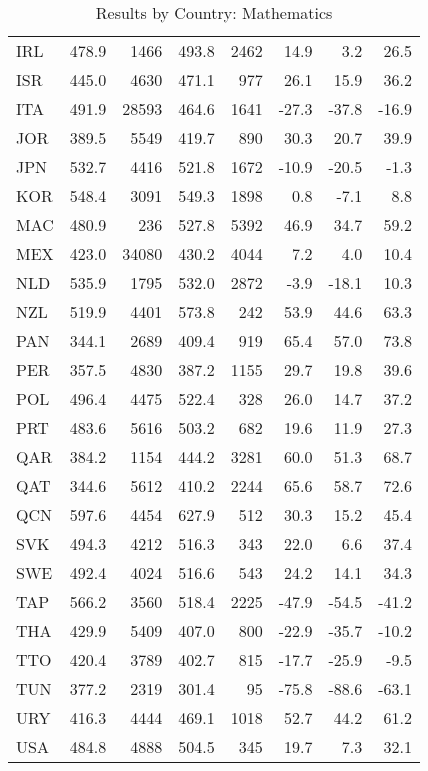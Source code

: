 \begin{table}[ht]
\begin{center}
{\begin{tabular}{lrr@{\extracolsep{10pt}}rr@{\extracolsep{10pt}}rrr}
  IRL & 478.9 & 1466 & 493.8 & 2462 & 14.9 & 3.2 & 26.5 \\ 
  ISR & 445.0 & 4630 & 471.1 & 977 & 26.1 & 15.9 & 36.2 \\ 
  ITA & 491.9 & 28593 & 464.6 & 1641 & -27.3 & -37.8 & -16.9 \\ 
  JOR & 389.5 & 5549 & 419.7 & 890 & 30.3 & 20.7 & 39.9 \\ 
  JPN & 532.7 & 4416 & 521.8 & 1672 & -10.9 & -20.5 & -1.3 \\ 
  KOR & 548.4 & 3091 & 549.3 & 1898 & 0.8 & -7.1 & 8.8 \\ 
  MAC & 480.9 & 236 & 527.8 & 5392 & 46.9 & 34.7 & 59.2 \\ 
  MEX & 423.0 & 34080 & 430.2 & 4044 & 7.2 & 4.0 & 10.4 \\ 
  NLD & 535.9 & 1795 & 532.0 & 2872 & -3.9 & -18.1 & 10.3 \\ 
  NZL & 519.9 & 4401 & 573.8 & 242 & 53.9 & 44.6 & 63.3 \\ 
  PAN & 344.1 & 2689 & 409.4 & 919 & 65.4 & 57.0 & 73.8 \\ 
  PER & 357.5 & 4830 & 387.2 & 1155 & 29.7 & 19.8 & 39.6 \\ 
  POL & 496.4 & 4475 & 522.4 & 328 & 26.0 & 14.7 & 37.2 \\ 
  PRT & 483.6 & 5616 & 503.2 & 682 & 19.6 & 11.9 & 27.3 \\ 
  QAR & 384.2 & 1154 & 444.2 & 3281 & 60.0 & 51.3 & 68.7 \\ 
  QAT & 344.6 & 5612 & 410.2 & 2244 & 65.6 & 58.7 & 72.6 \\ 
  QCN & 597.6 & 4454 & 627.9 & 512 & 30.3 & 15.2 & 45.4 \\ 
  SVK & 494.3 & 4212 & 516.3 & 343 & 22.0 & 6.6 & 37.4 \\ 
  SWE & 492.4 & 4024 & 516.6 & 543 & 24.2 & 14.1 & 34.3 \\ 
  TAP & 566.2 & 3560 & 518.4 & 2225 & -47.9 & -54.5 & -41.2 \\ 
  THA & 429.9 & 5409 & 407.0 & 800 & -22.9 & -35.7 & -10.2 \\ 
  TTO & 420.4 & 3789 & 402.7 & 815 & -17.7 & -25.9 & -9.5 \\ 
  TUN & 377.2 & 2319 & 301.4 & 95 & -75.8 & -88.6 & -63.1 \\ 
  URY & 416.3 & 4444 & 469.1 & 1018 & 52.7 & 44.2 & 61.2 \\ 
  USA & 484.8 & 4888 & 504.5 & 345 & 19.7 & 7.3 & 32.1 \\ 
   \hline
\end{tabular}
}
\caption{Results by Country: Mathematics}
\label{level2math}
\end{center}
\end{table}
